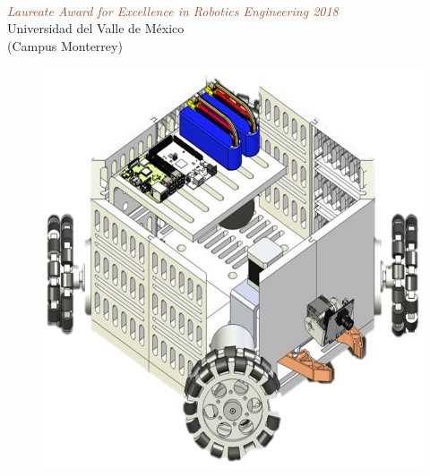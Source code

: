 \begin{titlepage} %

	\centering %
	
	
	\setlength{\unitlength}{0.6\textwidth} %
	
	{\color{LightGoldenrod}}\\[\baselineskip] %
	
	\textcolor{Sienna}{\textit{\Huge Laureate Award for Excellence in Robotics Engineering 2018}}\\[\baselineskip] %
	
	{\color{RosyBrown}\Large Universidad del Valle de México}\\ %
    {\color{RosyBrown}\Large (Campus Monterrey)}
	
	{\color{LightGoldenrod}} %
	
	\begin{figure}[H]
	    \label{fig:ide}
	    \centering
        \includegraphics[scale = 0.8]{ourRobot3}
    \end{figure}
	\vfill %
	

\end{titlepage}
